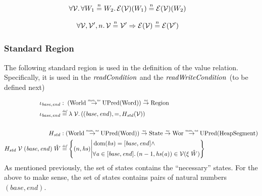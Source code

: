 \documentclass{article}
\newcommand{\monnefun}{\stackrel{\textit{\tiny{mon, ne}}}{\rightarrow}}
\newcommand{\nefun}{\stackrel{\textit{\tiny{ne}}}{\rightarrow}}
\newcommand{\defeq}{\stackrel{\textit{\tiny{def}}}{=}}
\newcommand{\nequal}[1][n]{\stackrel{\tiny{#1}}{=}}
\DeclareMathOperator{\dom}{dom}
\newcommand{\var}[1]{\mathit{#1}}
\newcommand{\hs}{\var{hs}}
\newcommand{\addr}{\var{a}}
\newcommand{\plainfun}[2]{
  \ifthenelse{\equal{#2}{}}
             {\mathit{#1}}
             {\mathit{#1}(#2)}
}
\newcommand{\readCond}[1]{\plainfun{readCondition}{#1}}
\newcommand{\writeCond}[1]{\plainfun{readWriteCondition}{#1}}
\newcommand{\asmType}{\plaindom{AsmType}}
\newcommand{\plaindom}[1]{\mathrm{#1}}
\newcommand{\Words}{\plaindom{Word}}
\newcommand{\HeapSegments}{\plaindom{HeapSegment}}
\newcommand{\States}{\plaindom{State}}
\newcommand{\Regions}{\plaindom{Region}}
\newcommand{\Worlds}{\plaindom{World}}
\newcommand{\Wor}{\plaindom{Wor}}
\newcommand{\UPred}[1]{\plaindom{UPred}(#1)}
\newcommand{\intr}[2]{\mathcal{#1}}
\newcommand{\valueintr}[1]{\intr{V}{#1}}
\newcommand{\exprintr}[1]{\intr{E}{#1}}
\newcommand{\stdvr}{\valueintr{\asmType}}
\newcommand{\stder}{\exprintr{\asmType}}
\newcommand{\npair}[2][n]{\left(#1,#2 \right)}
\begin{document}
\begin{lemma}
\label{lem:stder-ne-worlds}
\begin{align*}
  & \forall \stdvr \ldotp \forall W_1 \nequal W_2 \ldotp \stder(\stdvr)(W_1) \nequal \stder(\stdvr)(W_2)
\end{align*}
\end{lemma}

\begin{lemma}
\label{lem:stder-ne-vr}
\begin{align*}
  &\forall \stdvr, \stdvr', n \ldotp \stdvr \nequal \stdvr' \Rightarrow \stder(\stdvr) \nequal \stder(\stdvr')
\end{align*}
\end{lemma}


\subsubsection{Standard Region}
\label{subsubsec:standard-region}
The following standard region is used in the definition of the value relation. Specifically, it is used in the $\readCond{}$ and the $\writeCond{}$ (to be defined next)

\begin{align*}
  \iota_{\var{base},\var{end}} & : \; (\Worlds \monnefun \UPred{\Words}) \nefun \Regions\\
  \iota_{\var{base},\var{end}} & \defeq \lambda \; \stdvr \ldotp ((\var{base},\var{end}),=,H_{\var{std}} (\stdvr)) \\ & \\
  H_{\var{std}} & : (\Worlds \monnefun \UPred{\Words}) \nefun \States \nefun \Wor \monnefun \UPred{\HeapSegments} \\
  H_{\var{std}} \; \stdvr \; (\var{base},\var{end})\; \hat{W} &  \defeq \left\{ \npair{\hs} \middle|
                                               \begin{aligned}
                                                 & \dom(\hs) = [\var{base},\var{end}] \land \\
                                                 & \forall \addr \in [\var{base},\var{end}] \ldotp \npair[n-1]{\hs(\addr)} \in \stdvr(\xi \; \hat{W})
                                               \end{aligned} \right\}
\end{align*}
As mentioned previously, the set of states contains the ``necessary'' states. For the above to make sense, the set of states contains pairs of natural numbers $(\var{base},\var{end})$.
\end{document}
